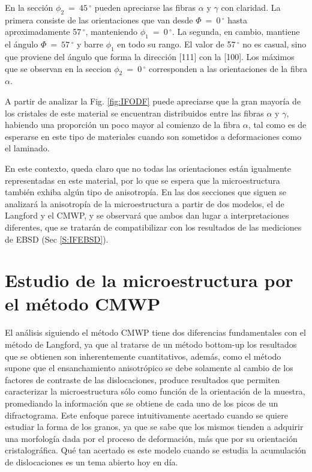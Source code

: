 En la sección $\phi_2 \ = \ 45$\,$^{\circ}$ pueden apreciarse las fibras $\alpha$ y $\gamma$ con claridad. 
La primera consiste de las orientaciones que van desde $\Phi \ = \ 0$\,$^{\circ}$ hasta aproximadamente 57\,$^{\circ}$, manteniendo $\phi_1 \ = \ 0$\,$^{\circ}$.
La segunda, en cambio, mantiene el ángulo $\Phi \ = \ 57$\,$^{\circ}$ y barre $\phi_1$ en todo su rango. El valor de 57\,$^{\circ}$ no es casual, sino que proviene del ángulo que forma la dirección [111] con la [100].
Los máximos que se observan en la seccion $\phi_2 \ = \ 0$\,$^{\circ}$ corresponden a las orientaciones de la fibra $\alpha$.

A partir de analizar la Fig. \ref{fig:IFODF} puede apreciarse que la gran mayoría de los cristales de este material se encuentran distribuidos entre las fibras $\alpha$ y $\gamma$, habiendo una proporción un poco mayor al comienzo de la fibra $\alpha$, tal como es de esperarse en este tipo de materiales cuando son sometidos a deformaciones como el laminado.

En este contexto, queda claro que no todas las orientaciones están igualmente representadas en este material, por lo que se espera que la microestructura también exhiba algún tipo de anisotropía.
En las dos secciones que siguen se analizará la anisotropía de la microestructura a partir de dos modelos, el de Langford y el CMWP, y se observará que ambos dan lugar a interpretaciones diferentes, que se tratarán de compatibilizar con los resultados de las mediciones de EBSD (Sec \ref{S:IFEBSD}).

\section{Estudio de la microestructura por el método CMWP}\label{S:IFCMWP}
El análisis siguiendo el método CMWP tiene dos diferencias fundamentales con el método de Langford, ya que al tratarse de un método bottom-up los resultados que se obtienen son inherentemente cuantitativos, además, como el método supone que el ensanchamiento anisotrópico se debe solamente al cambio de los factores de contraste de las dislocaciones, produce resultados que permiten caracterizar la microestructura sólo como función de la orientación de la muestra, promediando la información que se obtiene de cada uno de los picos de un difractograma. 
Este enfoque parece intuitivamente acertado cuando se quiere estudiar la forma de los granos, ya que se sabe que los mismos tienden a adquirir una morfología dada por el proceso de deformación, más que por su orientación cristalográfica.
Qué tan acertado es este modelo cuando se estudia la acumulación de dislocaciones es un tema abierto hoy en día.

